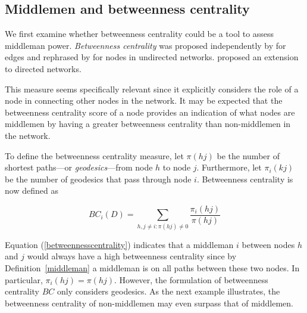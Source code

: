 \subsection{Middlemen and betweenness centrality}

We first examine whether betweenness centrality could be a tool to assess middleman power. \emph{Betweenness centrality} was proposed independently by \citet{Anthonisse1971} for edges and rephrased by \citet{Freeman1977} for nodes in undirected networks. \citet{White1994} proposed an extension to directed networks.

This measure seems specifically relevant since it explicitly considers the role of a node in connecting other nodes in the network. It may be expected that the betweenness centrality score of a node provides an indication of what nodes are middlemen by having a greater betweenness centrality than non-middlemen in the network.

To define the betweenness centrality measure, let $\pi(hj)$ be the number of shortest paths---or \emph{geodesics}---from node $h$ to node $j$. Furthermore, let $\pi_{i}(kj)$ be the number of geodesics that pass through node $i$. Betweenness centrality is now defined as

\begin{equation} \label{betweennesscentrality}
BC_{i}(D) = \sum_{h,j \neq i \colon \pi(hj) \neq 0} \frac{\pi_{i}(hj)}{\pi(hj)}
\end{equation}

Equation (\ref{betweennesscentrality}) indicates that a middleman $i$ between nodes $h$ and $j$ would always have a high betweenness centrality since by Definition~\ref{middleman} a middleman is on all paths between these two nodes. In particular, $\pi_i (hj) = \pi (hj)$. However, the formulation of betweenness centrality $BC$ only considers geodesics. As the next example illustrates, the betweenness centrality of non-middlemen may even surpass that of middlemen.

